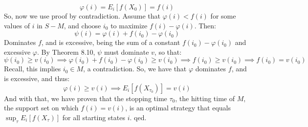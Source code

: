 \documentclass[12pt,a4paper]{article}
\newcommand{\1}[1]{\mathbbm{1}\left\{ #1 \right\}}
\begin{document}
$$
	\varphi(i) = E_i\left[f(X_0)\right] = f(i)
$$
So, now we use proof by contradiction. Assume that $\varphi(i) < f(i)$ for some values of $i$ in $S - M$, and choose $i_0$ to maximize $f(i) - \varphi(i)$. Then:
$$
	\psi(i) = \varphi(i) + f(i_0) - \varphi(i_0)
$$
Dominates $f$, and is excessive, being the sum of a constant $f(i_0) - \varphi(i_0)$ and excessive $\varphi$. By Theorem 8.10, $\psi$ must dominate $v$, so that:
$$
	\psi(i_0) \geq v(i_0) \implies
	\varphi(i_0) + f(i_0) - \varphi(i_0) \geq v(i_0) \implies
	f(i_0) \geq v(i_0) \implies
	f(i_0) = v(i_0)
$$
Recall, this implies $i_0 \in M$, a contradiction. So, we have that $\varphi$ dominates $f$, and is excessive, and thus:
$$
	\varphi(i) \geq v(i) \implies
	E_i\left[f(X_{\tau_0})\right] = v(i)
$$
And with that, we have proven that the stopping time $\tau_0$, the hitting time of $M$, the support set on which $f(i) = v(i)$, is an optimal strategy that equals $\sup_\tau E_i\left[f(X_\tau)\right]$ for all starting states $i$. qed.
\end{document}
